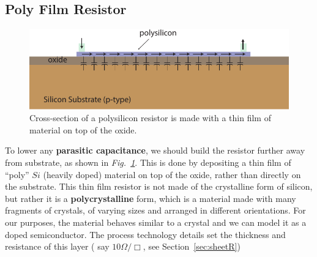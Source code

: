 \subsection{Poly Film Resistor}
\begin{figure}[tb]
\begin{center}
\includegraphics[width=.7\columnwidth]{poly_resistor}
\end{center}
\caption{Cross-section of a polysilicon resistor is made with a thin film of material on top of the oxide.}
\label{fig:mod2-2_ICtech_sld_6}
\end{figure}
To lower any \textbf{parasitic capacitance}, we should build the resistor further away from substrate, as shown in \emph{Fig.~\ref{fig:mod2-2_ICtech_sld_6}}. This is done by depositing a thin film of “poly” $Si$ (heavily doped) material on top of the oxide, rather than directly on the substrate.  This thin film resistor is not made of the crystalline form of silicon, but rather it is a \textbf{polycrystalline} form, which is a material made with many fragments of crystals, of varying sizes and arranged in different orientations.   For our purposes, the material behaves similar to a crystal and we can model it as a doped semiconductor.  The process technology details set the thickness and resistance of this layer ( say $10\Omega/\Box$, see Section~\ref{sec:sheetR})
\newpage
